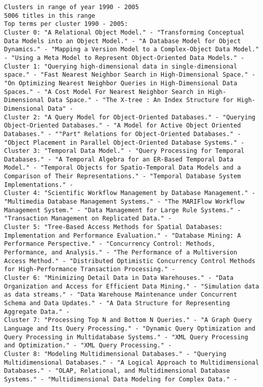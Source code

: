 \documentclass[11pt]{article}
\begin{document}
\begin{verbatim}
Clusters in range of year 1990 - 2005
5006 titles in this range
Top terms per cluster 1990 - 2005:
Cluster 0: "A Relational Object Model." - "Transforming Conceptual Data Models into an Object Model." - "A Database Model for Object Dynamics." - "Mapping a Version Model to a Complex-Object Data Model." - "Using a Meta Model to Represent Object-Oriented Data Models." - 
Cluster 1: "Querying high-dimensional data in single-dimensional space." - "Fast Nearest Neighbor Search in High-Dimensional Space." - "On Optimizing Nearest Neighbor Queries in High-Dimensional Data Spaces." - "A Cost Model For Nearest Neighbor Search in High-Dimensional Data Space." - "The X-tree : An Index Structure for High-Dimensional Data" - 
Cluster 2: "A Query Model for Object-Oriented Databases." - "Querying Object-Oriented Databases." - "A Model for Active Object Oriented Databases." - ""Part" Relations for Object-Oriented Databases." - "Object Placement in Parallel Object-Oriented Database Systems." - 
Cluster 3: "Temporal Data Model." - "Query Processing for Temporal Databases." - "A Temporal Algebra for an ER-Based Temporal Data Model." - "Temporal Objects for Spatio-Temporal Data Models and a Comparison of Their Representations." - "Temporal Database System Implementations." - 
Cluster 4: "Scientific Workflow Management by Database Management." - "Multimedia Database Management Systems." - "The MARIFlow Workflow Management System." - "Data Management for Large Rule Systems." - "Transaction Management on Replicated Data." - 
Cluster 5: "Tree-Based Access Methods for Spatial Databases: Implementation and Performance Evaluation." - "Database Mining: A Performance Perspective." - "Concurrency Control: Methods, Performance, and Analysis." - "The Performance of a Multiversion Access Method." - "Distributed Optimistic Concurrency Control Methods for High-Performance Transaction Processing." - 
Cluster 6: "Minimizing Detail Data in Data Warehouses." - "Data Organization and Access for Efficient Data Mining." - "Simulation data as data streams." - "Data Warehouse Maintenance under Concurrent Schema and Data Updates." - "A Data Structure for Representing Aggregate Data." - 
Cluster 7: "Processing Top N and Bottom N Queries." - "A Graph Query Language and Its Query Processing." - "Dynamic Query Optimization and Query Processing in Multidatabase Systems." - "XML Query Processing and Optimization." - "XML Query Processing." - 
Cluster 8: "Modeling Multidimensional Databases." - "Querying Multidimensional Databases." - "A Logical Approach to Multidimensional Databases." - "OLAP, Relational, and Multidimensional Database Systems." - "Multidimensional Data Modeling for Complex Data." - 

\end{verbatim}
\end{document}
